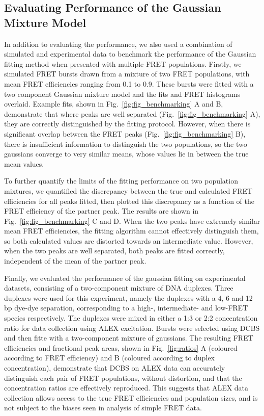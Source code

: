 \documentclass[10pt]{article}
\begin{document}
\subsection*{Evaluating Performance of the Gaussian Mixture Model}
In addition to evaluating the performance, we also used a combination of simulated and experimental data to benchmark the performance of the Gaussian fitting method when presented with multiple FRET populations. Firstly, we simulated FRET bursts drawn from a mixture of two FRET populations, with mean FRET efficiencies ranging from 0.1 to 0.9. These bursts were fitted with a two component Gaussian mixture model and the fits and FRET histograms overlaid. Example fits, shown in Fig.~\ref{fig:fig_benchmarking} A and B, demonstrate that where peaks are well separated (Fig.~\ref{fig:fig_benchmarking} A), they are correctly distinguished by the fitting protocol. However, when there is significant overlap between the FRET peaks (Fig.~\ref{fig:fig_benchmarking} B), there is insufficient information to distinguish the two populations, so the two gaussians converge to very similar means, whose values lie in between the true mean values.

To further quantify the limits of the fitting performance on two population mixtures, we quantified the discrepancy between the true and calculated FRET efficiencies for all peaks fitted, then plotted this discrepancy as a function of the FRET efficiency of the partner peak. The results are shown in Fig.~\ref{fig:fig_benchmarking} C and D. When the two peaks have extremely similar mean FRET efficiencies, the fitting algorithm cannot effectively distinguish them, so both calculated values are distorted towards an intermediate value. However, when the two peaks are well separated, both peaks are fitted correctly, independent of the mean of the partner peak.

Finally, we evaluated the performance of the gaussian fitting on experimental datasets, consisting of a two-component mixture of DNA duplexes. Three duplexes were used for this experiment, namely the duplexes with a 4, 6 and 12 bp dye-dye separation, corresponding to a high-, intermediate- and low-FRET species respectively. The duplexes were mixed in either a 1:3 or 2:2 concentration ratio for data collection using ALEX excitation. Bursts were selected using DCBS and then fitte with a two-component mixture of gaussians. The resulting FRET efficiencies and fractional peak areas, shown in Fig.~\ref{fig:ratios} A (coloured according to FRET efficiency) and B (coloured according to duplex concentration), demonstrate that DCBS on ALEX data can accurately distinguish each pair of FRET populations, without distortion, and that the concentration ratios are effectively reproduced. This suggests that ALEX data collection allows access to the true FRET efficiencies and population sizes, and is not subject to the biases seen in analysis of simple FRET data.     
\end{document}
